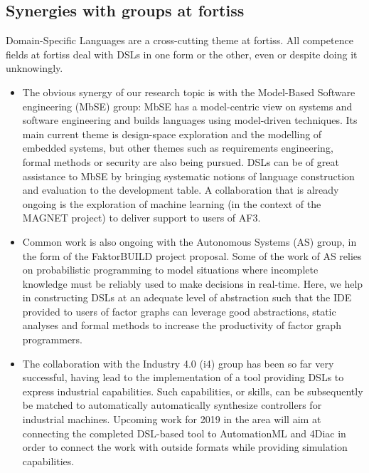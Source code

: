 \documentclass{scrartcl}
\begin{document}
\pagebreak
 
\begin{appendices}

\section{Synergies with groups at fortiss}
\label{app:synergies}

Domain-Specific Languages are a cross-cutting theme at fortiss. All
competence fields at fortiss deal with DSLs in one form or the
other, even or despite doing it unknowingly.

\begin{itemize}
\item The obvious synergy of our research topic is with the Model-Based
Software engineering (MbSE) group:
MbSE has a model-centric view on systems and software engineering and builds languages using model-driven
techniques. Its main current theme is design-space exploration and the modelling
of  embedded systems, but other themes such as requirements engineering, formal
methods or security are also being pursued. DSLs can be of great assistance to
MbSE by bringing systematic notions of language construction and evaluation to
the development table. A collaboration that is already ongoing is the
exploration of machine learning (in the context of the MAGNET project) to deliver support to users of AF3.
\item Common work is also ongoing with the Autonomous Systems (AS) group, in the
form of the FaktorBUILD project proposal. Some of the work of AS relies on probabilistic
programming to model situations where incomplete knowledge must be reliably used
to make decisions in real-time. Here, we help in constructing DSLs at an
adequate level of abstraction such that the IDE provided to users of factor
graphs can leverage good abstractions, static analyses and formal methods to
increase the productivity of factor graph programmers.
\item The collaboration with the Industry 4.0 (i4) group has been so far very
successful, having lead to the implementation of a tool
providing DSLs to express industrial capabilities. Such capabilities, or
skills, can be subsequently be matched to automatically automatically synthesize
controllers for industrial machines. Upcoming work for 2019 in the area will aim
at connecting the completed DSL-based tool to AutomationML and 4Diac in order
to connect the work with outside formats while providing simulation capabilities. 
\end{itemize}


\end{appendices}
\end{document}
